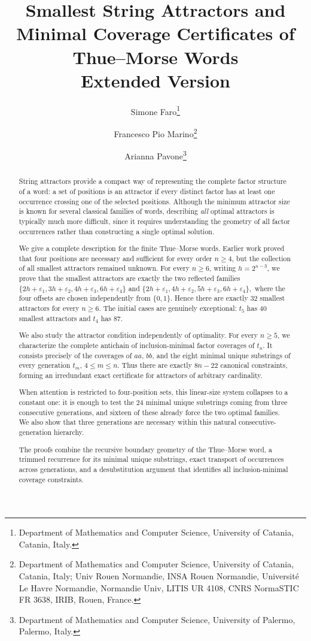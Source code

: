\documentclass[11pt,a4paper]{article}
\title{\textbf{Smallest String Attractors and Minimal Coverage Certificates of Thue--Morse Words}\\[0.5ex]
\large Extended Version}
\author{%
Simone Faro\thanks{Department of Mathematics and Computer Science, University of Catania, Catania, Italy.}
\and Francesco Pio Marino\thanks{Department of Mathematics and Computer Science, University of Catania, Catania, Italy; Univ Rouen Normandie, INSA Rouen Normandie, Universit\'e Le Havre Normandie, Normandie Univ, LITIS UR 4108, CNRS NormaSTIC FR 3638, IRIB, Rouen, France.}
\and Arianna Pavone\thanks{Department of Mathematics and Computer Science, University of Palermo, Palermo, Italy.}}
\date{}
\theoremstyle{definition}\newtheorem{definition}[theorem]{Definition}
\theoremstyle{remark}\newtheorem{remark}[theorem]{Remark}
\begin{document}
\maketitle

\begin{abstract}
String attractors provide a compact way of representing the complete factor structure of a word: a set of positions is an attractor if every distinct factor has at least one occurrence crossing one of the selected positions. Although the minimum attractor size is known for several classical families of words, describing \emph{all} optimal attractors is typically much more difficult, since it requires understanding the geometry of all factor occurrences rather than constructing a single optimal solution.

We give a complete description for the finite Thue--Morse words. Earlier work proved that four positions are necessary and sufficient for every order $n\geq 4$, but the collection of all smallest attractors remained unknown. For every $n\geq 6$, writing $h=2^{n-3}$, we prove that the smallest attractors are exactly the two reflected families
$
 \{2h+\varepsilon_1,3h+\varepsilon_2,4h+\varepsilon_3,6h+\varepsilon_4\}
$
and
$
 \{2h+\varepsilon_1,4h+\varepsilon_2,5h+\varepsilon_3,6h+\varepsilon_4\},
$
where the four offsets are chosen independently from $\{0,1\}$. Hence there are exactly $32$ smallest attractors for every $n\geq6$. The initial cases are genuinely exceptional: $t_5$ has $40$ smallest attractors and $t_4$ has $87$.

We also study the attractor condition independently of optimality. For every $n\geq5$, we characterize the complete antichain of inclusion-minimal factor coverages of $t_n$. It consists precisely of the coverages of $aa$, $bb$, and the eight minimal unique substrings of every generation $t_m$, $4\leq m\leq n$. Thus there are exactly $8n-22$ canonical constraints, forming an irredundant exact certificate for attractors of arbitrary cardinality.

When attention is restricted to four-position sets, this linear-size system collapses to a constant one: it is enough to test the $24$ minimal unique substrings coming from three consecutive generations, and sixteen of these already force the two optimal families. We also show that three generations are necessary within this natural consecutive-generation hierarchy.

The proofs combine the recursive boundary geometry of the Thue--Morse word, a trimmed recurrence for its minimal unique substrings, exact transport of occurrences across generations, and a desubstitution argument that identifies all inclusion-minimal coverage constraints.
\end{abstract}
\end{document}
